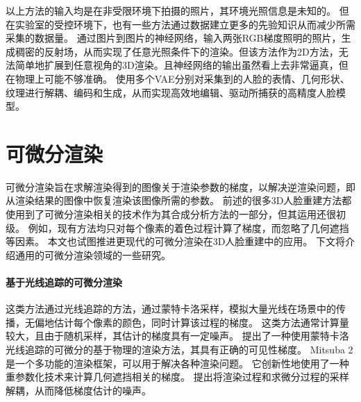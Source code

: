 以上方法的输入均是在非受限环境下拍摄的照片，其环境光照信息是未知的。
但在实验室的受控环境下，也有一些方法通过数据建立更多的先验知识从而减少所需采集的数据量。
\citet{MekaHPZFFKYBDDB19}通过图片到图片的神经网络，输入两张RGB梯度照明的照片，生成稠密的反射场，从而实现了任意光照条件下的渲染。但该方法作为2D方法，无法简单地扩展到任意视角的3D渲染。且神经网络的输出虽然看上去非常逼真，但在物理上可能不够准确。
\citet{ZhangZZLCYXY22}使用多个VAE分别对采集到的人脸的表情、几何形状、纹理进行解耦、编码和生成，从而实现高效地编辑、驱动所捕获的高精度人脸模型。

\section{可微分渲染}

可微分渲染旨在求解渲染得到的图像关于渲染参数的梯度，以解决逆渲染问题，即从渲染结果的图像中恢复渲染该图像所需的参数。
前述的很多3D人脸重建方法都使用到了可微分渲染相关的技术作为其合成分析方法的一部分，但其运用还很初级。
例如，现有方法均只对每个像素的着色过程计算了梯度，而忽略了几何遮挡等因素。
本文也试图推进更现代的可微分渲染在3D人脸重建中的应用。
下文将介绍通用的可微分渲染领域的一些研究。

\paragraph{基于光线追踪的可微分渲染}
这类方法通过光线追踪的方法，通过蒙特卡洛采样，模拟大量光线在场景中的传播，无偏地估计每个像素的颜色，同时计算该过程的梯度。
这类方法通常计算量较大，且由于随机采样，其估计的梯度具有一定噪声。
\citet{redner}提出了一种使用蒙特卡洛光线追踪的可微分的基于物理的渲染方法，其具有正确的可见性梯度。
Mitsuba 2\citep{Mitsuba2}是一个多功能的渲染框架，可以用于解决各种渲染问题。
它创新性地使用了一种重参数化技术来计算几何遮挡相关的梯度。
\citet{ZeltnerSGJ21}提出将渲染过程和求微分过程的采样解耦，从而降低梯度估计的噪声。

